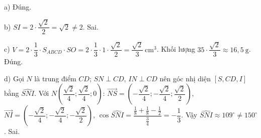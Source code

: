 \begin{ex}
{a) Đúng.

b) $SI=2\cdot\dfrac{\sqrt2}2=\sqrt2\ne2$. Sai.

c) $V=2\cdot\dfrac13\cdot S_{ABCD}\cdot SO=2\cdot\dfrac13\cdot1\cdot\dfrac{\sqrt2}2=\dfrac{\sqrt2}3\ \mathrm{cm^3}$. Khối lượng $35\cdot\dfrac{\sqrt2}3\approx16{,}5\ \mathrm g$. Đúng.

d) Gọi $N$ là trung điểm $CD$; $SN\perp CD$, $IN\perp CD$ nên góc nhị diện $[S,CD,I]$ bằng $\widehat{SNI}$. Với $N\left(\dfrac{\sqrt2}4;\dfrac{\sqrt2}4;0\right)$: $\overrightarrow{NS}=\left(-\dfrac{\sqrt2}4;-\dfrac{\sqrt2}4;\dfrac{\sqrt2}2\right)$, $\overrightarrow{NI}=\left(-\dfrac{\sqrt2}4;-\dfrac{\sqrt2}4;-\dfrac{\sqrt2}2\right)$, $\cos\widehat{SNI}=\dfrac{\frac18+\frac18-\frac12}{\frac34}=-\dfrac13$. Vậy $\widehat{SNI}\approx109^\circ\ne150^\circ$. Sai.}
\end{ex}
